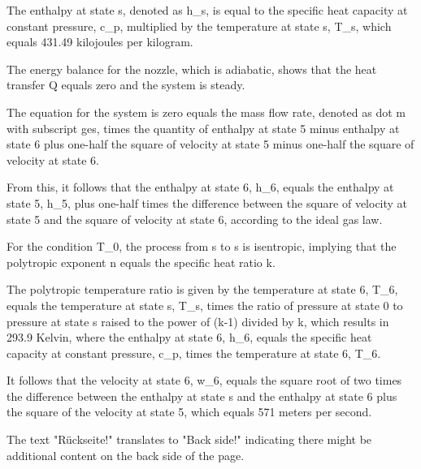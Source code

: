 The enthalpy at state s, denoted as h_s, is equal to the specific heat capacity at constant pressure, c_p, multiplied by the temperature at state s, T_s, which equals 431.49 kilojoules per kilogram.

The energy balance for the nozzle, which is adiabatic, shows that the heat transfer Q equals zero and the system is steady.

The equation for the system is zero equals the mass flow rate, denoted as dot m with subscript ges, times the quantity of enthalpy at state 5 minus enthalpy at state 6 plus one-half the square of velocity at state 5 minus one-half the square of velocity at state 6.

From this, it follows that the enthalpy at state 6, h_6, equals the enthalpy at state 5, h_5, plus one-half times the difference between the square of velocity at state 5 and the square of velocity at state 6, according to the ideal gas law.

For the condition T_0, the process from s to s is isentropic, implying that the polytropic exponent n equals the specific heat ratio k.

The polytropic temperature ratio is given by the temperature at state 6, T_6, equals the temperature at state s, T_s, times the ratio of pressure at state 0 to pressure at state s raised to the power of (k-1) divided by k, which results in 293.9 Kelvin, where the enthalpy at state 6, h_6, equals the specific heat capacity at constant pressure, c_p, times the temperature at state 6, T_6.

It follows that the velocity at state 6, w_6, equals the square root of two times the difference between the enthalpy at state s and the enthalpy at state 6 plus the square of the velocity at state 5, which equals 571 meters per second.

The text "Rückseite!" translates to "Back side!" indicating there might be additional content on the back side of the page.